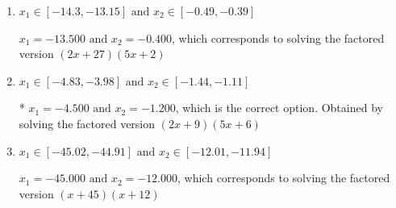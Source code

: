 \documentclass{extbook}[14pt]
\begin{document}
\begin{enumerate}
{\begin{enumerate}[label=\Alph*.]
$x_1 = -3.600 \text{ and } x_2 = -1.500$, which corresponds to solving the factored version $(5x + 18)(2x + 3)$
\item \( x_1 \in [-14.3, -13.15] \text{ and } x_2 \in [-0.49, -0.39] \)

$x_1 = -13.500 \text{ and } x_2 = -0.400$, which corresponds to solving the factored version $(2x + 27)(5x + 2)$
\item \( x_1 \in [-4.83, -3.98] \text{ and } x_2 \in [-1.44, -1.11] \)

* $x_1 = -4.500 \text{ and } x_2 = -1.200$, which is the correct option. Obtained by solving the factored version $(2x + 9)(5x + 6)$
\item \( x_1 \in [-45.02, -44.91] \text{ and } x_2 \in [-12.01, -11.94] \)

$x_1 = -45.000 \text{ and } x_2 = -12.000$, which corresponds to solving the factored version $(x + 45)(x + 12)$
\end{enumerate}

}
\end{enumerate}
\end{document}

